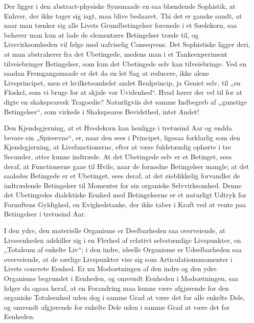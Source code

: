 \documentclass[12pt,a4paper]{book}
\begin{document}
Der ligger i den abstract-physiske Synsmaade en saa blændende Sophistik,
at Enhver, der ikke tager sig iagt, maa blive bedaaret. Thi det er
ganske sandt, at naar man tænker sig alle Livets Grundbetingelser
forenede i et Sædekorn, saa behøver man kun at lade de elementære
Betingelser træde til, og Livsvirksomheden vil følge med uafviselig
Conseqvens. Det Sophistiske ligger deri, at man abstraherer fra det
Ubetingede, medens man i et Tankeexperiment tilveiebringer Betingelser,
som kun det Ubetingede selv kan tilveiebringe. Ved en saadan
Fremgangsmaade er det da en let Sag at reducere, ikke alene
Livsprincipet, men et hvilketsomhelst andet Realprincip, ja Geniet selv,
til „en Floskel, som vi bruge for at skjule vor Uvidenhed“. Hvad hører
der vel til for at digte en shakspearesk Tragoedie? Naturligviis det
samme Indbegreb af „gunstige Betingelser“, som virkede i Shakspeares
Bevidsthed, intet Andet!

Den Kjendsgjerning, at et Hvedekorn kan henligge i tretusind Aar og
endda bevare sin „Spireevne“, er, naar
den sees i Principet, ligesaa forklarlig som den Kjendsgjerning, at
Livsfunctionerne, efter at være fuldstændig ophørte i tre Secunder,
atter kunne indtræde. At det Ubetingede selv er et Betinget, sees deraf,
at Functionerne gaae til Hvile, naar de fornødne Betingelser mangle; at
det saaledes Betingede er et Ubetinget, sees deraf, at det øieblikkelig
forvandler de indtrædende Betingelser til Momenter for sin organiske
Selvvirksomhed. Denne det Ubetingedes dialektiske Eenhed med
Betingelserne er et naturligt Udtryk for Fornuftens Gyldighed, en
Evighedstanke, der ikke taber i Kraft ved at vente paa Betingelser i
tretusind Aar.

I den ydre, den materielle Organisme er Deelbarheden saa overveiende, at
Livseenheden adskiller sig i en Flerhed af relativt selvstændige
Livspunkter, en „Totalsum af enkelte Liv“; i den indre, ideelle
Organisme er Udeelbarheden saa overveiende, at de særlige Livspunkter
vise sig som Articulationsmomenter i Livets concrete Eenhed. Er nu
Modsætningen af den indre og den ydre Organisme begrundet i Eenheden, og
omvendt Eenheden i Modsætningen, saa følger da ogsaa heraf, at en
Forandring maa kunne være afgjørende for den organiske Totaleenhed uden
dog i samme Grad at være det for alle enkelte Dele, og omvendt
afgjørende for enkelte Dele uden i samme Grad at være det for Eenheden.
\end{document}
